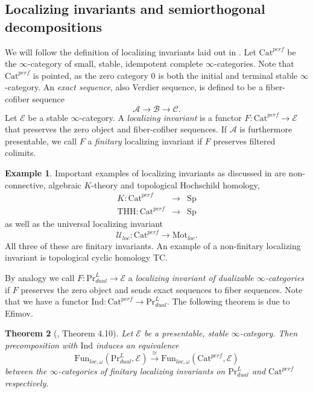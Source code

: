 \documentclass[10pt]{amsart}
\newtheorem{theorem}{Theorem}[section]
\theoremstyle{definition}
\newtheorem{example}[theorem]{Example}
\begin{document}
\subsection{Localizing invariants and semiorthogonal decompositions}

We will follow the definition of localizing invariants laid out in \cite{blumberg_gepner_tabuada}. Let $\mathrm{Cat}^{perf}$ be the $\infty$-category of small, stable, idempotent complete $\infty$-categories. Note that $\mathrm{Cat}^{perf}$ is pointed, as the zero category $0$ is both the initial and terminal stable $\infty$-category. An \emph{exact sequence}, also Verdier sequence, is defined to be a fiber-cofiber sequence
$$\mathcal{A} \rightarrow \mathcal{B} \rightarrow \mathcal{C}.$$
Let $\mathcal{E}$ be a stable $\infty$-category. A \emph{localizing invariant} is a functor $F : \mathrm{Cat}^{perf} \rightarrow \mathcal{E}$ that preserves the zero object  and fiber-cofiber sequences. If $\mathcal{A}$ is furthermore presentable, we call $F$ a \emph{finitary} localizing invariant if $F$ preserves filtered colimits.

\begin{example}
Important examples of localizing invariants as discussed in \cite{blumberg_gepner_tabuada} are non-connective, algebraic $K$-theory and topological Hochschild homology,
$$\begin{array}{rcl}
K : \mathrm{Cat}^{perf} & \rightarrow & \mathrm{Sp} \\ 
\mathrm{THH} : \mathrm{Cat}^{perf} & \rightarrow & \mathrm{Sp}
\end{array}$$
as well as the universal localizing invariant
$$ \mathcal{U}_{loc} : \mathrm{Cat}^{perf} \rightarrow \mathrm{Mot}_{loc}.$$
All three of these are finitary invariants. An example of a non-finitary localizing invariant is topological cyclic homology $\mathrm{TC}$.
\end{example}

By analogy we call $F : \mathrm{Pr}^{L}_{dual} \rightarrow \mathcal{E}$ a \emph{localizing invariant of dualizable $\infty$-categories} if $F$ preserves the zero object and sends exact sequences to fiber sequences. Note that we have a functor $\mathrm{Ind} : \mathrm{Cat}^{perf} \rightarrow \mathrm{Pr}^{L}_{dual}$. The following theorem is due to Efimov.

\begin{theorem}[\cite{efimov2025ktheorylocalizinginvariantslarge}, Theorem 4.10]
Let $\mathcal{E}$ be a presentable, stable $\infty$-category. Then precomposition with $\mathrm{Ind}$ induces an equivalence
$$ \mathrm{Fun}_{loc, \omega}( \mathrm{Pr}^{L}_{dual}, \mathcal{E} ) \xrightarrow{ \cong } \mathrm{Fun}_{loc, \omega}( \mathrm{Cat}^{perf}, \mathcal{E} )$$
between the $\infty$-categories of finitary localizing invariants on $\mathrm{Pr}^{L}_{dual}$ and $\mathrm{Cat}^{perf}$ respectively.
\end{theorem}
\end{document}
